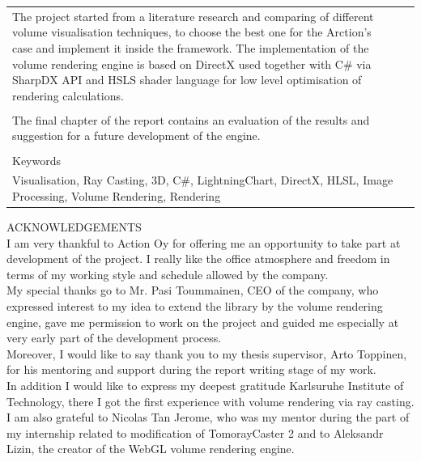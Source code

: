 \documentclass[english]{article}
\begin{document}
\begin{table}[htbp]
\begin{tabular}{| l | l | l | l |}
{The project started from a literature research and comparing of different volume visualisation techniques, to choose the best one for the Arction's case and implement it inside the framework. The implementation of the volume rendering engine is based on DirectX used together with C\# via SharpDX API and HSLS shader language for low level optimisation of rendering calculations.
}\\
\multicolumn{4}{|l|}{ }\\
\multicolumn{4}{|p{14cm}|}{
The final chapter of the report contains an evaluation of the results and suggestion for a future development of the engine.
}\\
\multicolumn{4}{|l|}{ }\\
\hline
\multicolumn{4}{|l|}{Keywords}\\
\multicolumn{4}{|p{14cm}|}{Visualisation, Ray Casting, 3D, C\#, LightningChart, DirectX, HLSL, Image Processing, Volume Rendering, Rendering}\\
\hline
\end{tabular}
\end{table}

\newpage

ACKNOWLEDGEMENTS\\

I am very thankful to Action Oy for offering me an opportunity to take part at development of the project. I really like the office atmosphere and freedom in terms of my working style and schedule allowed by the company.\\

My special thanks go to Mr. Pasi Toummainen, CEO of the company, who expressed interest to my idea to extend the library by the volume rendering engine,  gave me permission to work on the project and guided me especially at very early part of the development process.\\

Moreover, I would like to say thank you to my thesis supervisor, Arto Toppinen, for his mentoring and support during the report writing stage of my work. \\

In addition I would like to express my deepest gratitude Karlsuruhe Institute of Technology, there I got the first experience with volume rendering via ray casting. I am also grateful to Nicolas Tan Jerome, who was my mentor during the part of my internship related to modification of TomorayCaster 2 and to Aleksandr Lizin, the creator of the WebGL volume rendering engine.

\newpage

\tableofcontents
\end{document}
